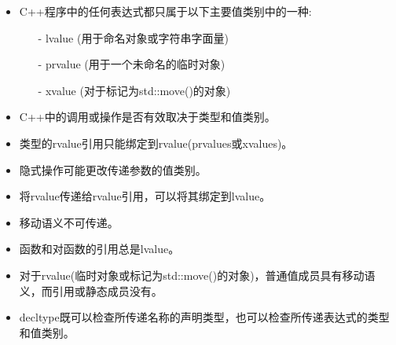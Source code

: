 \begin{itemize}
	\item C++程序中的任何表达式都只属于以下主要值类别中的一种:
	\begin{itemize}
		\item[-] lvalue (用于命名对象或字符串字面量)
		\item[-] prvalue (用于一个未命名的临时对象)
		\item[-] xvalue (对于标记为std::move()的对象)
	\end{itemize}
	\item C++中的调用或操作是否有效取决于类型和值类别。
	\item 类型的rvalue引用只能绑定到rvalue(prvalues或xvalues)。
	\item 隐式操作可能更改传递参数的值类别。
	\item 将rvalue传递给rvalue引用，可以将其绑定到lvalue。
	\item 移动语义不可传递。
	\item 函数和对函数的引用总是lvalue。
	\item 对于rvalue(临时对象或标记为std::move()的对象)，普通值成员具有移动语义，而引用或静态成员没有。
	\item decltype既可以检查所传递名称的声明类型，也可以检查所传递表达式的类型和值类别。
\end{itemize}


\newpage